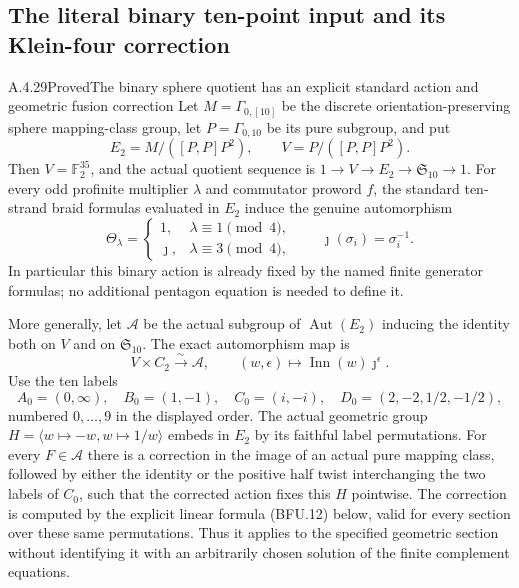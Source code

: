 \subsection{The literal binary ten-point input and its Klein-four correction}

\begin{result}{A.4.29}{Proved}{The binary sphere quotient has an explicit standard action and geometric fusion correction}
\label{thm:sphere10-binary-fusion}
Let $M=\Gamma_{0,[10]}$ be the discrete orientation-preserving
sphere mapping-class group, let $P=\Gamma_{0,10}$ be its pure
subgroup, and put
\[
 E_2=M/([P,P]P^2),\qquad V=P/([P,P]P^2).
                                                               \tag{BFU.1}
\]
Then $V=\mathbb F_2^{35}$, and the actual quotient sequence is
$1\to V\to E_2\to\mathfrak S_{10}\to1$.
For every odd profinite multiplier $\lambda$ and commutator
proword $f$, the standard ten-strand braid formulas evaluated
in $E_2$ induce the genuine automorphism
\[
 \Theta_\lambda=
 \begin{cases}
  1,&\lambda\equiv1\pmod4,\\
  \jmath,&\lambda\equiv3\pmod4,
 \end{cases}
 \qquad \jmath(\sigma_i)=\sigma_i^{-1}.
                                                               \tag{BFU.2}
\]
In particular this binary action is already fixed by the named
finite generator formulas; no additional pentagon equation is
needed to define it.

More generally, let $\mathcal A$ be the actual subgroup of
$\operatorname{Aut}(E_2)$ inducing the identity both on $V$
and on $\mathfrak S_{10}$.  The exact automorphism map is
\[
 V\times C_2\xrightarrow{\sim}\mathcal A,
       \qquad (w,\epsilon)\longmapsto
                    \operatorname{Inn}(w)\jmath^\epsilon.
                                                               \tag{BFU.3}
\]
Use the ten labels
\[
 A_0=(0,\infty),\quad B_0=(1,-1),\quad C_0=(i,-i),
 \quad D_0=(2,-2,1/2,-1/2),
                                                               \tag{BFU.4}
\]
numbered $0,\ldots,9$ in the displayed order.  The actual
geometric group $H=\langle w\mapsto-w,w\mapsto1/w\rangle$
embeds in $E_2$ by its faithful label permutations.
For every $F\in\mathcal A$ there is a correction in the image
of an actual pure mapping class, followed by either the identity
or the positive half twist interchanging the two labels of $C_0$,
such that the corrected action fixes this $H$ pointwise.
The correction is computed by the explicit linear formula
(BFU.12) below, valid for every section over these same
permutations.  Thus it applies to the specified geometric
section without identifying it with an arbitrarily chosen
solution of the finite complement equations.
\end{result}


